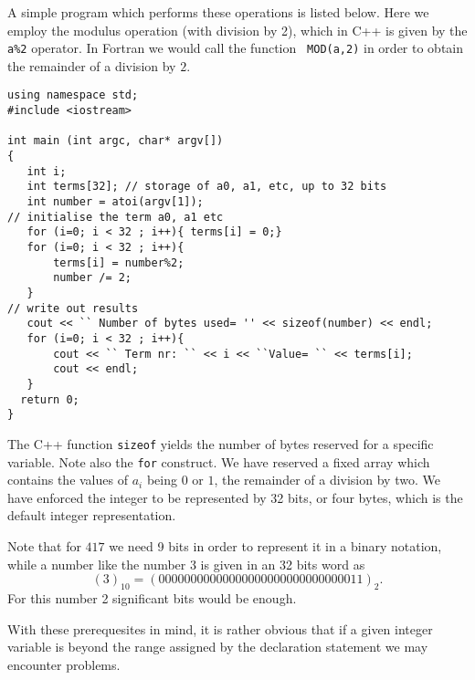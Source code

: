 A simple program which performs these operations is listed below. Here we 
employ the modulus operation (with division by 2), which in C++ is given by the \verb?a%2? operator.
In Fortran  we would call the function
\verb? MOD(a,2)? in order to obtain the remainder of a division by $2$. 
\lstset{language=c++}
\begin{lstlisting}[title={\url{http://folk.uio.no/mhjensen/compphys/programs/chapter02/cpp/program2.cpp}}]
using namespace std;
#include <iostream>

int main (int argc, char* argv[])
{
   int i; 
   int terms[32]; // storage of a0, a1, etc, up to 32 bits
   int number = atoi(argv[1]); 
// initialise the term a0, a1 etc
   for (i=0; i < 32 ; i++){ terms[i] = 0;}
   for (i=0; i < 32 ; i++){ 
       terms[i] = number%2;
       number /= 2;
   }
// write out results
   cout << `` Number of bytes used= '' << sizeof(number) << endl;
   for (i=0; i < 32 ; i++){ 
       cout << `` Term nr: `` << i << ``Value= `` << terms[i];
       cout << endl;
   }
  return 0;  
}
\end{lstlisting}
The C++ function \verb?sizeof? yields the number of bytes reserved for 
a specific variable. Note also the \verb?for? construct. We have reserved a 
fixed array which contains the values of $a_i$ being $0$ or $1$, the remainder
of a division by two. We have enforced the integer to be represented by 32 bits, or four
bytes, which is the default integer representation.

Note that for $417$ we need 9 bits in order to represent it in a binary notation, while a number like
the number 3 is given in an 32 bits word as
\[
  (3)_{10}= (00000000000000000000000000000011)_2.
\]
For this number  2 significant bits would be enough.



With these prerequesites in mind, it is rather obvious that
if a given integer variable is beyond the range assigned by the 
declaration statement we may encounter problems.



